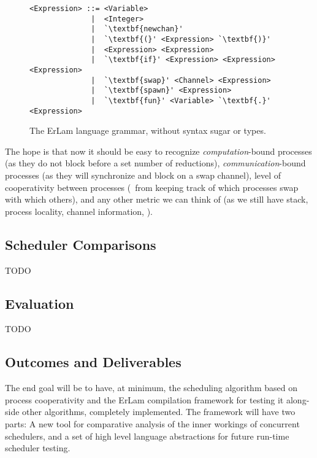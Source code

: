 \begin{figure} %
\centering
\begin{BVerbatim}[commandchars=\\\{\}]
<Expression> ::= <Variable> 
              |  <Integer>
              |  `\textbf{newchan}'
              |  `\textbf{(}' <Expression> `\textbf{)}'
              |  <Expression> <Expression>
              |  `\textbf{if}' <Expression> <Expression> <Expression>
              |  `\textbf{swap}' <Channel> <Expression>
              |  `\textbf{spawn}' <Expression>
              |  `\textbf{fun}' <Variable> `\textbf{.}' <Expression>
\end{BVerbatim}
\caption{The ErLam language grammar, without syntax sugar or types.}
\label{fig:grammer}
\end{figure}

The hope is that now it should be easy to recognize {\em computation}-bound processes (as they do not block
before a set number of reductions), {\em communication}-bound processes (as they will synchronize and block
on a swap channel), level of cooperativity between processes (\ie~from keeping track of which processes swap with
which others), and any other metric we can think of (as we still have stack, process locality, channel
information, \etc).

\subsection{Scheduler Comparisons}
\label{sec:schedwork}
TODO

\subsection{Evaluation}
\label{sec:workevaluation}
TODO

\subsection{Outcomes and Deliverables}
\label{sec:outcomes}

The end goal will be to have, at minimum, the scheduling algorithm based on process cooperativity and 
the ErLam compilation framework for testing it along-side other algorithms, completely implemented. The 
framework will have two parts: A new tool for comparative analysis of the inner workings of concurrent 
schedulers, and a set of high level language abstractions for future run-time scheduler testing.

